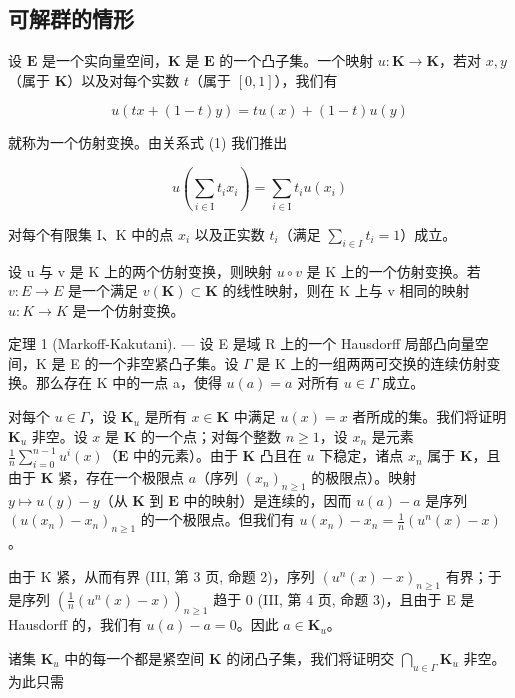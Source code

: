 \subsection{可解群的情形}

设 \(\mathbf{E}\) 是一个实向量空间，\(\mathbf{K}\) 是 \(\mathbf{E}\) 的一个凸子集。一个映射 \(u: \mathbf{K} \to \mathbf{K}\)，若对 \(x, y\)（属于 \(\mathbf{K}\)）以及对每个实数 \(t\)（属于 \([0, 1]\)），我们有

\[
u (t x + (1 - t) y) = t u (x) + (1 - t) u (y)\tag{1}
\]

就称为一个仿射变换。由关系式 (1) 我们推出

\[
u \left(\sum_ {i \in \mathrm{I}} t _ {i} x _ {i}\right) = \sum_ {i \in \mathrm{I}} t _ {i} u \left(x _ {i}\right)\tag{2}
\]

对每个有限集 I、K 中的点 \(x_{i}\) 以及正实数 \(t_i\)（满足 \(\sum_{i\in I}t_i = 1\)）成立。

设 u 与 v 是 K 上的两个仿射变换，则映射 \(u \circ v\) 是 K 上的一个仿射变换。若 \(v: E \to E\) 是一个满足 \(v(\mathbf{K}) \subset \mathbf{K}\) 的线性映射，则在 K 上与 v 相同的映射 \(u: K \to K\) 是一个仿射变换。

定理 1 (Markoff-Kakutani). --- 设 E 是域 R 上的一个 Hausdorff 局部凸向量空间，K 是 E 的一个非空紧凸子集。设 \(\Gamma\) 是 K 上的一组两两可交换的连续仿射变换。那么存在 K 中的一点 a，使得 \(u(a) = a\) 对所有 \(u \in \Gamma\) 成立。

对每个 \(u \in \Gamma\)，设 \(\mathbf{K}_u\) 是所有 \(x \in \mathbf{K}\) 中满足 \(u(x) = x\) 者所成的集。我们将证明 \(\mathbf{K}_u\) 非空。设 \(x\) 是 \(\mathbf{K}\) 的一个点；对每个整数 \(n \geqslant 1\)，设 \(x_n\) 是元素 \(\frac{1}{n} \sum_{i=0}^{n-1} u^i(x)\)（\(\mathbf{E}\) 中的元素）。由于 \(\mathbf{K}\) 凸且在 \(u\) 下稳定，诸点 \(x_n\) 属于 \(\mathbf{K}\)，且由于 \(\mathbf{K}\) 紧，存在一个极限点 \(a\)（序列 \((x_n)_{n \geqslant 1}\) 的极限点）。映射 \(y \mapsto u(y) - y\)（从 \(\mathbf{K}\) 到 \(\mathbf{E}\) 中的映射）是连续的，因而 \(u(a) - a\) 是序列 \((u(x_n) - x_n)_{n \geqslant 1}\) 的一个极限点。但我们有 \(u(x_n) - x_n = \frac{1}{n} (u^n(x) - x)\)。

由于 K 紧，从而有界 (III, 第 3 页, 命题 2)，序列 \((u^n(x) - x)_{n\geqslant 1}\) 有界；于是序列 \(\left(\frac{1}{n} (u^n (x) - x)\right)_{n\geqslant 1}\) 趋于 0 (III, 第 4 页, 命题 3)，且由于 E 是 Hausdorff 的，我们有 \(u(a) - a = 0\)。因此 \(a\in \mathbf{K}_u\)。

诸集 \(\mathbf{K}_u\) 中的每一个都是紧空间 \(\mathbf{K}\) 的闭凸子集，我们将证明交 \(\bigcap_{u\in \Gamma}\mathbf{K}_u\) 非空。为此只需

